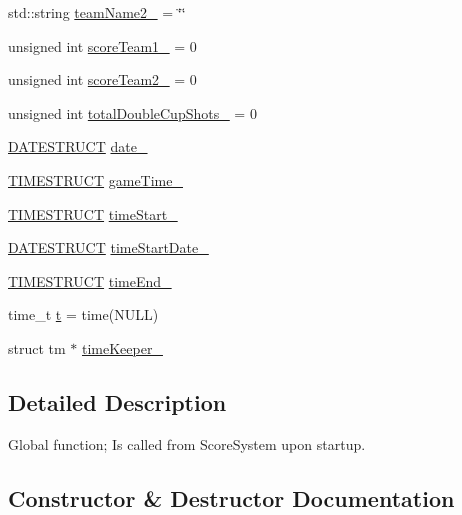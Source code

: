 \begin{DoxyCompactItemize}
\item 
std\+::string \hyperlink{class_website_score_handling_adc827082fdf0f563d26f087e2b8370d8}{team\+Name2\+\_\+} = \char`\"{}\char`\"{}
\item 
unsigned int \hyperlink{class_website_score_handling_aeb7146ed461fb35fc306c4eb4b6b398e}{score\+Team1\+\_\+} = 0
\item 
unsigned int \hyperlink{class_website_score_handling_a7ef10df17b3d100b009d8aea310b20bd}{score\+Team2\+\_\+} = 0
\item 
unsigned int \hyperlink{class_website_score_handling_a65a1d48c99c30982ff2b4c92a8c67961}{total\+Double\+Cup\+Shots\+\_\+} = 0
\item 
\hyperlink{struct_website_score_handling_1_1_d_a_t_e_s_t_r_u_c_t}{D\+A\+T\+E\+S\+T\+R\+U\+CT} \hyperlink{class_website_score_handling_a9ea8d35694c2f0a0b602ce32c2587da3}{date\+\_\+}
\item 
\hyperlink{struct_website_score_handling_1_1_t_i_m_e_s_t_r_u_c_t}{T\+I\+M\+E\+S\+T\+R\+U\+CT} \hyperlink{class_website_score_handling_a771503421f01243f69b609d8ca7a98db}{game\+Time\+\_\+}
\item 
\hyperlink{struct_website_score_handling_1_1_t_i_m_e_s_t_r_u_c_t}{T\+I\+M\+E\+S\+T\+R\+U\+CT} \hyperlink{class_website_score_handling_ac29bace30d83c7626d093f6cb5529ed1}{time\+Start\+\_\+}
\item 
\hyperlink{struct_website_score_handling_1_1_d_a_t_e_s_t_r_u_c_t}{D\+A\+T\+E\+S\+T\+R\+U\+CT} \hyperlink{class_website_score_handling_af393f7cce22756cda28cf109ab68c0e5}{time\+Start\+Date\+\_\+}
\item 
\hyperlink{struct_website_score_handling_1_1_t_i_m_e_s_t_r_u_c_t}{T\+I\+M\+E\+S\+T\+R\+U\+CT} \hyperlink{class_website_score_handling_a2c8bcd11b50c2db8019a5cde5c0e22a4}{time\+End\+\_\+}
\item 
time\+\_\+t \hyperlink{class_website_score_handling_ace26e5e42d3cbf978d921a03368797a8}{t} = time(N\+U\+LL)
\item 
struct tm $\ast$ \hyperlink{class_website_score_handling_a5360288826018542bb68945cb8401361}{time\+Keeper\+\_\+}
\end{DoxyCompactItemize}


\subsection{Detailed Description}
Global function; Is called from Score\+System upon startup. 

\subsection{Constructor \& Destructor Documentation}
\mbox{\label{class_website_score_handling_ac0753b597e9933d012400e68b2fc772b}} 
